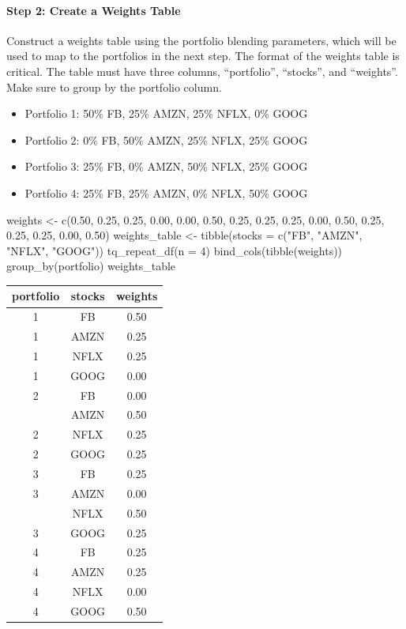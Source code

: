 \hspace{20 mm}

\paragraph{Step 2: Create a Weights
Table}\label{step-2-create-a-weights-table}

Construct a weights table using the portfolio blending parameters, which
will be used to map to the portfolios in the next step. The format of
the weights table is critical. The table must have three columns,
``portfolio'', ``stocks'', and ``weights''. Make sure to group by the
portfolio column.

\begin{itemize}
\tightlist
\item
  Portfolio 1: 50\% FB, 25\% AMZN, 25\% NFLX, 0\% GOOG
\item
  Portfolio 2: 0\% FB, 50\% AMZN, 25\% NFLX, 25\% GOOG
\item
  Portfolio 3: 25\% FB, 0\% AMZN, 50\% NFLX, 25\% GOOG
\item
  Portfolio 4: 25\% FB, 25\% AMZN, 0\% NFLX, 50\% GOOG
\end{itemize}

\begin{Schunk}
\begin{Sinput}
weights <- c(0.50, 0.25, 0.25, 0.00,
             0.00, 0.50, 0.25, 0.25,
             0.25, 0.00, 0.50, 0.25, 
             0.25, 0.25, 0.00, 0.50)
weights_table <- tibble(stocks = c("FB", "AMZN", "NFLX", "GOOG")) %
    tq_repeat_df(n = 4) %
    bind_cols(tibble(weights)) %
    group_by(portfolio)
weights_table
\end{Sinput}
\end{Schunk}

\begin{tabular}{ccc}
\toprule
portfolio & stocks & weights\\
\midrule
1 & FB & 0.50\\
1 & AMZN & 0.25\\
1 & NFLX & 0.25\\
1 & GOOG & 0.00\\
2 & FB & 0.00\\
\addlinespace
2 & AMZN & 0.50\\
2 & NFLX & 0.25\\
2 & GOOG & 0.25\\
3 & FB & 0.25\\
3 & AMZN & 0.00\\
\addlinespace
3 & NFLX & 0.50\\
3 & GOOG & 0.25\\
4 & FB & 0.25\\
4 & AMZN & 0.25\\
4 & NFLX & 0.00\\
4 & GOOG & 0.50\\
\bottomrule
\end{tabular}

